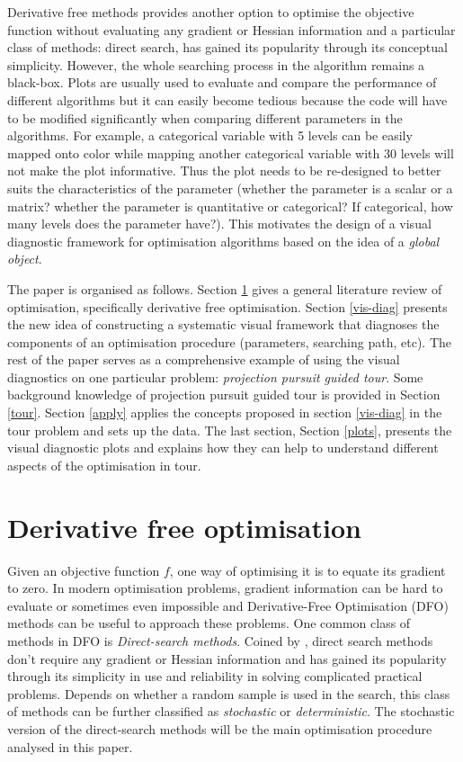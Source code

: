 \documentclass[12pt]{article}
\begin{document}
Derivative free methods provides another option to optimise the
objective function without evaluating any gradient or Hessian
information and a particular class of methods: direct search, has gained
its popularity through its conceptual simplicity. However, the whole
searching process in the algorithm remains a black-box. Plots are
usually used to evaluate and compare the performance of different
algorithms but it can easily become tedious because the code will have
to be modified significantly when comparing different parameters in the
algorithms. For example, a categorical variable with 5 levels can be
easily mapped onto color while mapping another categorical variable with
30 levels will not make the plot informative. Thus the plot needs to be
re-designed to better suits the characteristics of the parameter
(whether the parameter is a scalar or a matrix? whether the parameter is
quantitative or categorical? If categorical, how many levels does the
parameter have?). This motivates the design of a visual diagnostic
framework for optimisation algorithms based on the idea of a
\emph{global object}.

The paper is organised as follows. Section \ref{DFO} gives a general
literature review of optimisation, specifically derivative free
optimisation. Section \ref{vis-diag} presents the new idea of
constructing a systematic visual framework that diagnoses the components
of an optimisation procedure (parameters, searching path, etc). The rest
of the paper serves as a comprehensive example of using the visual
diagnostics on one particular problem: \emph{projection pursuit guided
tour}. Some background knowledge of projection pursuit guided tour is
provided in Section \ref{tour}. Section \ref{apply} applies the concepts
proposed in section \ref{vis-diag} in the tour problem and sets up the
data. The last section, Section \ref{plots}, presents the visual
diagnostic plots and explains how they can help to understand different
aspects of the optimisation in tour.

\hypertarget{DFO}{%
\section{Derivative free optimisation}\label{DFO}}

Given an objective function \(f\), one way of optimising it is to equate
its gradient to zero. In modern optimisation problems, gradient
information can be hard to evaluate or sometimes even impossible and
Derivative-Free Optimisation (DFO) methods can be useful to approach
these problems. One common class of methods in DFO is
\emph{Direct-search methods}. Coined by \citet{hooke1961direct}, direct
search methods don't require any gradient or Hessian information and has
gained its popularity through its simplicity in use and reliability in
solving complicated practical problems. Depends on whether a random
sample is used in the search, this class of methods can be further
classified as \emph{stochastic} or \emph{deterministic}. The stochastic
version of the direct-search methods will be the main optimisation
procedure analysed in this paper.
\end{document}
